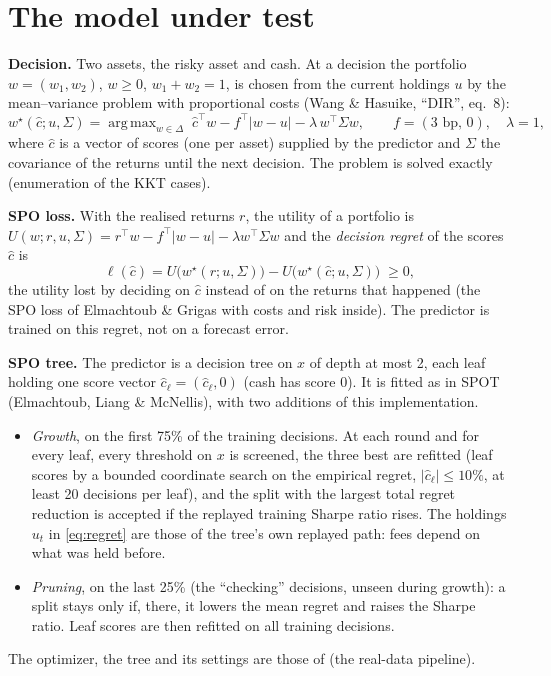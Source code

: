 \documentclass[11pt,a4paper]{article}
\newcommand{\code}[1]{\texttt{\detokenize{#1}}}
\DeclareMathOperator*{\argmax}{arg\,max}
\newcommand{\1}{\mathbf{1}}
\begin{document}
\section{The model under test}\label{sec:model}
\textbf{Decision.} Two assets, the risky asset and cash. At a decision the portfolio $w=(w_1,w_2)$, $w\ge0$, $w_1+w_2=1$, is chosen from the current holdings $u$ by the mean--variance problem with proportional costs (Wang \& Hasuike, ``DIR'', eq.~8):
\begin{equation}\label{eq:opt}
w^\star(\hat c;u,\Sigma)=\argmax_{w\in\Delta}\;\hat c^\top w-f^\top|w-u|-\lambda\,w^\top\Sigma w,
\qquad f=(3\text{ bp},\,0),\quad \lambda=1,
\end{equation}
where $\hat c$ is a vector of scores (one per asset) supplied by the predictor and $\Sigma$ the covariance of the returns until the next decision. The problem is solved exactly (enumeration of the KKT cases).

\textbf{SPO loss.} With the realised returns $r$, the utility of a portfolio is $U(w;r,u,\Sigma)=r^\top w-f^\top|w-u|-\lambda w^\top\Sigma w$ and the \emph{decision regret} of the scores $\hat c$ is
\begin{equation}\label{eq:regret}
\ell(\hat c)=U\!\big(w^\star(r;u,\Sigma)\big)-U\!\big(w^\star(\hat c;u,\Sigma)\big)\;\ge 0,
\end{equation}
the utility lost by deciding on $\hat c$ instead of on the returns that happened (the SPO loss of Elmachtoub \& Grigas with costs and risk inside). The predictor is trained on this regret, not on a forecast error.

\textbf{SPO tree.} The predictor is a decision tree on $x$ of depth at most 2, each leaf holding one score vector $\hat c_\ell=(\hat c_\ell,0)$ (cash has score 0). It is fitted as in SPOT (Elmachtoub, Liang \& McNellis), with two additions of this implementation.
\begin{itemize}\setlength{\itemsep}{1pt}
\item \emph{Growth}, on the first 75\% of the training decisions. At each round and for every leaf, every threshold on $x$ is screened, the three best are refitted (leaf scores by a bounded coordinate search on the empirical regret, $|\hat c_\ell|\le10\%$, at least 20 decisions per leaf), and the split with the largest total regret reduction is accepted if the replayed training Sharpe ratio rises. The holdings $u_t$ in \eqref{eq:regret} are those of the tree's own replayed path: fees depend on what was held before.
\item \emph{Pruning}, on the last 25\% (the ``checking'' decisions, unseen during growth): a split stays only if, there, it lowers the mean regret and raises the Sharpe ratio. Leaf scores are then refitted on all training decisions.
\end{itemize}
The optimizer, the tree and its settings are those of \code{run.py} (the real-data pipeline).
\end{document}
